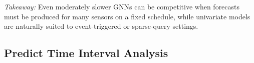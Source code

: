 \documentclass[10pt]{article}
\begin{document}
\begin{keydiscovery1}
 \emph{Takeaway:}
 Even moderately slower GNNs can be competitive
when forecasts must be produced for many sensors on a fixed schedule, while univariate models are naturally
suited to event-triggered or sparse-query settings.  
\end{keydiscovery1}





\subsection{Predict Time Interval Analysis}
\end{document}
